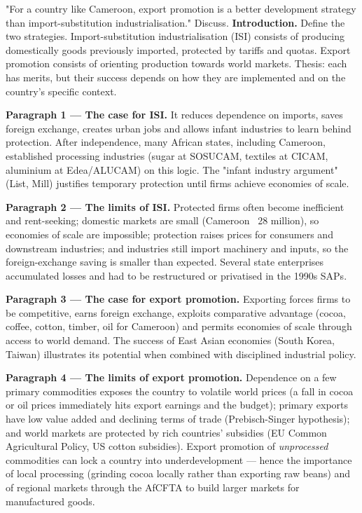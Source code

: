 \documentclass[11pt]{article}
\newcommand{\cle}[1]{{\popxbold\color{popdark}#1}}
\begin{document}
\begin{exoresolu}
"For a country like Cameroon, export promotion is a better development strategy than import-substitution industrialisation." Discuss.
\tcblower
\textbf{Introduction.} Define the two strategies. \cle{Import-substitution industrialisation (ISI)} consists of producing domestically goods previously imported, protected by tariffs and quotas. \cle{Export promotion} consists of orienting production towards world markets. Thesis: each has merits, but their success depends on how they are implemented and on the country's specific context.

\textbf{Paragraph 1 — The case for ISI.} It reduces dependence on imports, saves foreign exchange, creates urban jobs and allows infant industries to learn behind protection. After independence, many African states, including Cameroon, established processing industries (sugar at SOSUCAM, textiles at CICAM, aluminium at Edea/ALUCAM) on this logic. The "infant industry argument" (List, Mill) justifies temporary protection until firms achieve economies of scale.

\textbf{Paragraph 2 — The limits of ISI.} Protected firms often become inefficient and rent-seeking; domestic markets are small (Cameroon ~28 million), so economies of scale are impossible; protection raises prices for consumers and downstream industries; and industries still import machinery and inputs, so the foreign-exchange saving is smaller than expected. Several state enterprises accumulated losses and had to be restructured or privatised in the 1990s SAPs.

\textbf{Paragraph 3 — The case for export promotion.} Exporting forces firms to be competitive, earns foreign exchange, exploits comparative advantage (cocoa, coffee, cotton, timber, oil for Cameroon) and permits economies of scale through access to world demand. The success of East Asian economies (South Korea, Taiwan) illustrates its potential when combined with disciplined industrial policy.

\textbf{Paragraph 4 — The limits of export promotion.} Dependence on a few primary commodities exposes the country to volatile world prices (a fall in cocoa or oil prices immediately hits export earnings and the budget); primary exports have low value added and declining terms of trade (Prebisch-Singer hypothesis); and world markets are protected by rich countries' subsidies (EU Common Agricultural Policy, US cotton subsidies). Export promotion of \emph{unprocessed} commodities can lock a country into underdevelopment — hence the importance of local processing (grinding cocoa locally rather than exporting raw beans) and of regional markets through the \cle{AfCFTA} to build larger markets for manufactured goods.


\end{exoresolu}
\end{document}
